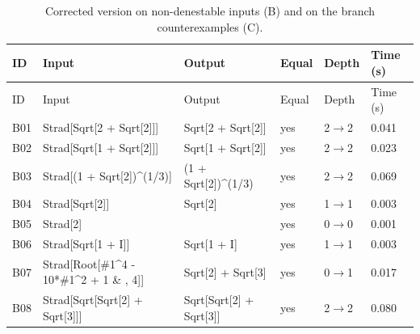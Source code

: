 \begin{longtable}{@{}p{}>{\ttfamily\footnotesize\raggedright\arraybackslash}p{}>{\ttfamily\footnotesize\raggedright\arraybackslash}p{}p{}p{}p{}@{}}
\caption{Corrected version on non-denestable inputs (B) and on the branch counterexamples (C).}\label{tab:fixedBC}\\
\toprule ID & Input & Output & Equal & Depth & Time (s)\\\midrule\endfirsthead
\toprule ID & Input & Output & Equal & Depth & Time (s)\\\midrule\endhead
\bottomrule\endfoot
B01 & Strad[\allowbreak{}Sqrt[\allowbreak{}2 +\allowbreak{} Sqrt[\allowbreak{}2]\allowbreak{}]\allowbreak{}]\allowbreak{} & Sqrt[\allowbreak{}2 +\allowbreak{} Sqrt[\allowbreak{}2]\allowbreak{}]\allowbreak{} & yes & 2$\to$2 & 0.041\\
B02 & Strad[\allowbreak{}Sqrt[\allowbreak{}1 +\allowbreak{} Sqrt[\allowbreak{}2]\allowbreak{}]\allowbreak{}]\allowbreak{} & Sqrt[\allowbreak{}1 +\allowbreak{} Sqrt[\allowbreak{}2]\allowbreak{}]\allowbreak{} & yes & 2$\to$2 & 0.023\\
B03 & Strad[\allowbreak{}(\allowbreak{}1 +\allowbreak{} Sqrt[\allowbreak{}2]\allowbreak{})\allowbreak{}\textasciicircum{}\allowbreak{}(\allowbreak{}1/\allowbreak{}3)\allowbreak{}]\allowbreak{} & (\allowbreak{}1 +\allowbreak{} Sqrt[\allowbreak{}2]\allowbreak{})\allowbreak{}\textasciicircum{}\allowbreak{}(\allowbreak{}1/\allowbreak{}3)\allowbreak{} & yes & 2$\to$2 & 0.069\\
B04 & Strad[\allowbreak{}Sqrt[\allowbreak{}2]\allowbreak{}]\allowbreak{} & Sqrt[\allowbreak{}2]\allowbreak{} & yes & 1$\to$1 & 0.003\\
B05 & Strad[\allowbreak{}2]\allowbreak{} & 2 & yes & 0$\to$0 & 0.001\\
B06 & Strad[\allowbreak{}Sqrt[\allowbreak{}1 +\allowbreak{} I]\allowbreak{}]\allowbreak{} & Sqrt[\allowbreak{}1 +\allowbreak{} I]\allowbreak{} & yes & 1$\to$1 & 0.003\\
B07 & Strad[\allowbreak{}Root[\allowbreak{}\#1\textasciicircum{}\allowbreak{}4 -\allowbreak{} 10*\allowbreak{}\#1\textasciicircum{}\allowbreak{}2 +\allowbreak{} 1 \& ,\allowbreak{} 4]\allowbreak{}]\allowbreak{} & Sqrt[\allowbreak{}2]\allowbreak{} +\allowbreak{} Sqrt[\allowbreak{}3]\allowbreak{} & yes & 0$\to$1 & 0.017\\
B08 & Strad[\allowbreak{}Sqrt[\allowbreak{}Sqrt[\allowbreak{}2]\allowbreak{} +\allowbreak{} Sqrt[\allowbreak{}3]\allowbreak{}]\allowbreak{}]\allowbreak{} & Sqrt[\allowbreak{}Sqrt[\allowbreak{}2]\allowbreak{} +\allowbreak{} Sqrt[\allowbreak{}3]\allowbreak{}]\allowbreak{} & yes & 2$\to$2 & 0.080\\

\end{longtable}
